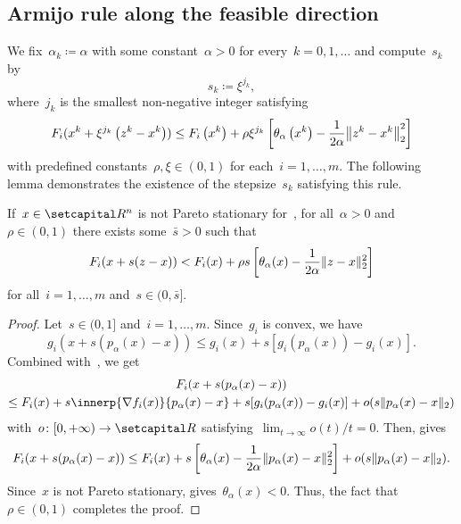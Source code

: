 \documentclass[../main]{subfiles}
\begin{document}
\subsection{Armijo rule along the feasible direction} 
We fix~$\alpha_k \coloneqq \alpha$ with some constant~$\alpha > 0$ for every~$k = 0, 1, \dots$ and compute~$s_k$ by
\begin{equation} \label{eq:pgm_armijo_step}
    s_k \coloneqq \xi^{j_k}
    ,\end{equation}
where~$j_k$ is the smallest non-negative integer satisfying
\begin{equation} \label{eq:pgm_armijo_rule}
    F_i(x^k + \xi^{j_k} \left(z^k - x^k\right)) \le F_i\left(x^k\right) + \rho \xi^{j_k} \left[\theta_\alpha\left(x^k\right) - \frac{1}{2 \alpha} \norm*{z^k - x^k}_2^2\right]
\end{equation}
with predefined constants~$\rho, \xi \in (0, 1)$ for each~$i = 1, \dots, m$.
The following lemma demonstrates the existence of the stepsize~$s_k$ satisfying this rule.
\begin{lemma} 
    If~$x \in \setR^n$ is not Pareto stationary for~, for all~$\alpha > 0$ and~$\rho \in (0, 1)$ there exists some~$\bar{s} > 0$ such that
    \begin{equation}
        F_i(x + s (z - x)) < F_i(x) + \rho s \left[\theta_\alpha(x) - \frac{1}{2 \alpha} \lVert z - x\rVert_2^2\right]
    \end{equation}
    for all~$i = 1, \dots, m$ and~$s \in (0, \bar{s}]$.
\end{lemma}
\begin{proof}
    Let~$s \in (0, 1]$ and~$i = 1, \dots, m$.
        Since~$g_i$ is convex, we have
        \begin{equation}
            g_i(x + s (p_\alpha(x) - x)) \le g_i(x) + s [g_i(p_\alpha(x)) - g_i(x)]
            .\end{equation}
        Combined with~, we get
        \begin{multline}
            F_i(x + s (p_\alpha(x) - x)) \\
            \le F_i(x) + s \innerp{\nabla f_i(x)}{p_\alpha(x) - x} + s [g_i(p_\alpha(x)) - g_i(x)] + o(s \norm{p_\alpha(x) - x}_2)
        \end{multline}
        with~$o \colon [0, + \infty) \to \setR$ satisfying~$\lim_{t \to \infty} o(t) / t = 0$.
    Then,  gives
    \begin{equation}
        F_i(x + s (p_\alpha(x) - x))
        \le F_i(x) + s \left[ \theta_\alpha(x) - \frac{1}{2 \alpha} \lVert p_\alpha(x) - x\rVert_2^2 \right] + o(s \lVert p_\alpha(x) - x\rVert_2)
        .\end{equation}
    Since~$x$ is not Pareto stationary,  gives~$\theta_\alpha(x) < 0$.
    Thus, the fact that~$\rho \in (0, 1)$ completes the proof.
\end{proof}
\end{document}
